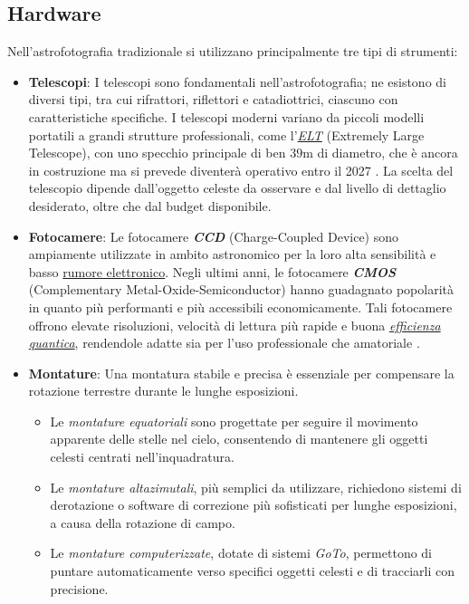\subsection{Hardware} \label{subsec:hardware}

Nell'astrofotografia tradizionale si utilizzano principalmente tre tipi di strumenti:

\begin{itemize}
    \item \textbf{Telescopi}: I telescopi sono fondamentali nell'astrofotografia; ne esistono di diversi tipi, tra cui rifrattori, riflettori e catadiottrici, ciascuno con caratteristiche specifiche. I telescopi moderni variano da piccoli modelli portatili a grandi strutture professionali, come l'\textit{\href{https://elt.eso.org/}{ELT}} (Extremely Large Telescope), con uno specchio principale di ben $39 \text{m}$ di diametro, che è ancora in costruzione ma si prevede diventerà operativo entro il 2027 \cite{elt}. La scelta del telescopio dipende dall'oggetto celeste da osservare e dal livello di dettaglio desiderato, oltre che dal budget disponibile.

    \item \textbf{Fotocamere}: Le fotocamere \textit{\textbf{CCD}} (Charge-Coupled Device) sono ampiamente utilizzate in ambito astronomico per la loro alta sensibilità e basso \hyperref[sec:noise]{rumore elettronico}. Negli ultimi anni, le fotocamere \textit{\textbf{CMOS}} (Complementary Metal-Oxide-Semiconductor) hanno guadagnato popolarità in quanto più performanti e più accessibili economicamente. Tali fotocamere offrono elevate risoluzioni, velocità di lettura più rapide e buona \href{https://it.wikipedia.org/wiki/Efficienza_quantica}{\textit{efficienza quantica}}, rendendole adatte sia per l'uso professionale che amatoriale \cite{image_processing}.
    
    \item \textbf{Montature}: Una montatura stabile e precisa è essenziale per compensare la rotazione terrestre durante le lunghe esposizioni.

    \begin{itemize}
        \item Le \textit{montature equatoriali} sono progettate per seguire il movimento apparente delle stelle nel cielo, consentendo di mantenere gli oggetti celesti centrati nell'inquadratura.
        \item Le \textit{montature altazimutali}, più semplici da utilizzare, richiedono sistemi di derotazione o software di correzione più sofisticati per lunghe esposizioni, a causa della rotazione di campo.
        \item Le \textit{montature computerizzate}, dotate di sistemi \textit{GoTo}, permettono di puntare automaticamente verso specifici oggetti celesti e di tracciarli con precisione.
    \end{itemize}

\end{itemize}

